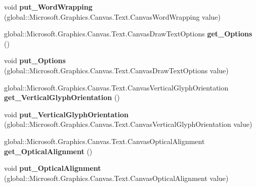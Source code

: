 \begin{DoxyCompactItemize}
void {\bfseries put\+\_\+\+Word\+Wrapping} (global\+::\+Microsoft.\+Graphics.\+Canvas.\+Text.\+Canvas\+Word\+Wrapping value)
\item 
\mbox{\label{class_microsoft_1_1_graphics_1_1_canvas_1_1_text_1_1_canvas_text_format_af5d308c3a1f87b675c1b52eff7c0148c}} 
global\+::\+Microsoft.\+Graphics.\+Canvas.\+Text.\+Canvas\+Draw\+Text\+Options {\bfseries get\+\_\+\+Options} ()
\item 
\mbox{\label{class_microsoft_1_1_graphics_1_1_canvas_1_1_text_1_1_canvas_text_format_a2cb2c8c70a2db084b058574b75fbe1fb}} 
void {\bfseries put\+\_\+\+Options} (global\+::\+Microsoft.\+Graphics.\+Canvas.\+Text.\+Canvas\+Draw\+Text\+Options value)
\item 
\mbox{\label{class_microsoft_1_1_graphics_1_1_canvas_1_1_text_1_1_canvas_text_format_ac501273bff089574992daf9dd1c47eb8}} 
global\+::\+Microsoft.\+Graphics.\+Canvas.\+Text.\+Canvas\+Vertical\+Glyph\+Orientation {\bfseries get\+\_\+\+Vertical\+Glyph\+Orientation} ()
\item 
\mbox{\label{class_microsoft_1_1_graphics_1_1_canvas_1_1_text_1_1_canvas_text_format_a78bb0a96f5140c39fdae9d2808bd58a0}} 
void {\bfseries put\+\_\+\+Vertical\+Glyph\+Orientation} (global\+::\+Microsoft.\+Graphics.\+Canvas.\+Text.\+Canvas\+Vertical\+Glyph\+Orientation value)
\item 
\mbox{\label{class_microsoft_1_1_graphics_1_1_canvas_1_1_text_1_1_canvas_text_format_a531fd44472e54817a9c459cce652d68f}} 
global\+::\+Microsoft.\+Graphics.\+Canvas.\+Text.\+Canvas\+Optical\+Alignment {\bfseries get\+\_\+\+Optical\+Alignment} ()
\item 
\mbox{\label{class_microsoft_1_1_graphics_1_1_canvas_1_1_text_1_1_canvas_text_format_a425c22e2e7141efc0555fd442659f0b7}} 
void {\bfseries put\+\_\+\+Optical\+Alignment} (global\+::\+Microsoft.\+Graphics.\+Canvas.\+Text.\+Canvas\+Optical\+Alignment value)

\end{DoxyCompactItemize}
